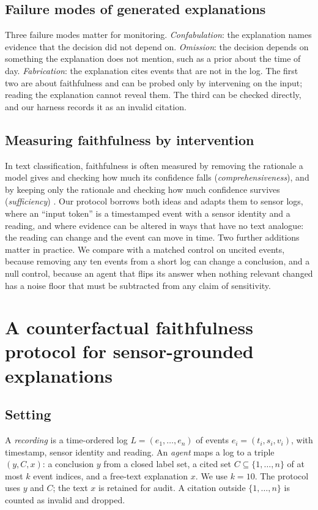 \documentclass[11pt,a4paper]{article}
\begin{document}
\subsection{Failure modes of generated explanations}
Three failure modes matter for monitoring. \emph{Confabulation}: the explanation names evidence that the decision did not depend on. \emph{Omission}: the decision depends on something the explanation does not mention, such as a prior about the time of day. \emph{Fabrication}: the explanation cites events that are not in the log. The first two are about faithfulness and can be probed only by intervening on the input; reading the explanation cannot reveal them. The third can be checked directly, and our harness records it as an invalid citation.

\subsection{Measuring faithfulness by intervention}
In text classification, faithfulness is often measured by removing the rationale a model gives and checking how much its confidence falls (\emph{comprehensiveness}), and by keeping only the rationale and checking how much confidence survives (\emph{sufficiency}) \cite{deyoung2020eraser}. Our protocol borrows both ideas and adapts them to sensor logs, where an ``input token'' is a timestamped event with a sensor identity and a reading, and where evidence can be altered in ways that have no text analogue: the reading can change and the event can move in time. Two further additions matter in practice. We compare with a matched control on uncited events, because removing any ten events from a short log can change a conclusion, and a null control, because an agent that flips its answer when nothing relevant changed has a noise floor that must be subtracted from any claim of sensitivity.

\section{A counterfactual faithfulness protocol for sensor-grounded explanations}
\label{sec:protocol}

\subsection{Setting}
A \emph{recording} is a time-ordered log $L=(e_1,\dots,e_n)$ of events $e_i=(t_i,s_i,v_i)$, with timestamp, sensor identity and reading. An \emph{agent} maps a log to a triple $(y, C, x)$: a conclusion $y$ from a closed label set, a cited set $C\subseteq\{1,\dots,n\}$ of at most $k$ event indices, and a free-text explanation $x$. We use $k=10$. The protocol uses $y$ and $C$; the text $x$ is retained for audit. A citation outside $\{1,\dots,n\}$ is counted as invalid and dropped.
\end{document}
